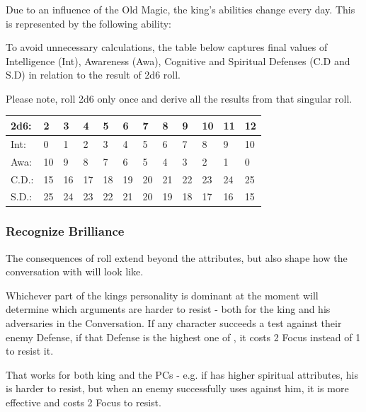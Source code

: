 \subsubsection{\abilityTaravangianBoonName{}}
\label{enemyDiagramTaravangian}

Due to an influence of the Old Magic, the king's abilities change every day. This is represented by the following ability:

\abilityTaravangianBoon{}

To avoid unnecessary calculations, the table below captures final values of Intelligence (Int), Awareness (Awa), Cognitive and Spiritual Defenses (C.D and S.D) in relation to the result of 2d6 roll.

Please note, roll 2d6 only once and derive all the results from that singular roll. \\

\noindent
\footnotesize
\begin{tabular}{l l l l l l l l l l l l}
	2d6: & 2 & 3 & 4 & 5 & 6 & 7 & 8 & 9 & 10 & 11 & 12 \\ \hline
	Int: & 0 & 1 & 2 & 3 & 4 & 5 & 6 & 7 & 8 & 9 & 10 \\ 
	Awa: & 10 & 9 & 8 & 7 & 6 & 5 & 4 & 3 & 2 & 1 & 0 \\
	C.D.: & 15 & 16 & 17 & 18 & 19 & 20 & 21 & 22 & 23 & 24 & 25 \\
	S.D.: & 25 & 24 & 23 & 22 & 21 & 20 & 19 & 18 & 17 & 16 & 15 \\
\end{tabular}
\normalsize


\subsubsection{Recognize Brilliance}

The consequences of \abilityTaravangianBoonName{} roll extend beyond the attributes, but also shape how the conversation with \enemyTaravangian{} will look like.

Whichever part of the kings personality is dominant at the moment will determine which arguments are harder to resist - both for the king and his adversaries in the Conversation. If any character succeeds a test against their enemy Defense, if that Defense is the highest one of \enemyTaravangian{}, it costs 2 Focus instead of 1 to resist it.

That works for both king and the PCs - e.g. if \enemyTaravangian{} has higher spiritual attributes, his \skillPersuasion{} is harder to resist, but when an enemy successfully uses \skillPersuasion{} against him, it is more effective and costs \enemyTaravangian{} 2 Focus to resist.


